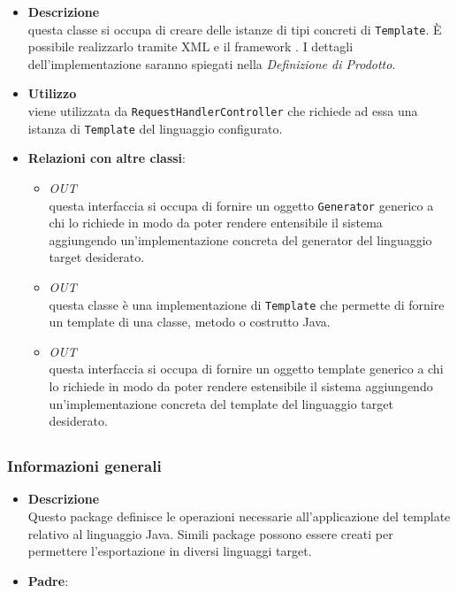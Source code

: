 \label{\nogloxy{swedesigner::server::template::TemplateAssembler}}
\begin{itemize}
\item \textbf{Descrizione}\\
questa classe si occupa di creare delle istanze di tipi concreti di \texttt{Template}. È possibile realizzarlo tramite XML e il framework \spring. I dettagli dell'implementazione saranno spiegati nella \emph{Definizione di Prodotto}. %
\item \textbf{Utilizzo}\\
viene utilizzata da \texttt{RequestHandlerController} che richiede ad essa una istanza di \texttt{Template} del linguaggio configurato.
\item \textbf{Relazioni con altre classi}:
\begin{itemize}
\item \textit{OUT} \hyperref[\nogloxy{swedesigner::server::generator::Generator}]{}\\
questa interfaccia si occupa di fornire un oggetto \texttt{Generator} generico a chi lo richiede in modo da poter rendere entensibile il sistema aggiungendo un'implementazione concreta del generator del linguaggio target desiderato.
\item \textit{OUT} \hyperref[\nogloxy{swedesigner::server::template::java::JavaTemplate}]{}\\
questa classe è una implementazione di \texttt{Template} che permette di fornire un template di una classe, metodo o costrutto Java.
\item \textit{OUT} \hyperref[\nogloxy{swedesigner::server::template::Template}]{}\\
questa interfaccia si occupa di fornire un oggetto template generico a chi lo richiede in modo da poter rendere estensibile il sistema aggiungendo un'implementazione concreta del template del linguaggio target desiderato.
\end{itemize}
\end{itemize}
\subsection{}
\label{\nogloxy{swedesigner::server::template::java}}
\subsubsection{Informazioni generali}
\begin{itemize}
\item \textbf{Descrizione}\\
Questo package definisce le operazioni necessarie all'applicazione del template relativo al linguaggio Java. Simili package possono essere creati per permettere l'esportazione in diversi linguaggi target.
\item \textbf{Padre}: \hyperref[\nogloxy{swedesigner::server::template}]{}
\end{itemize}
